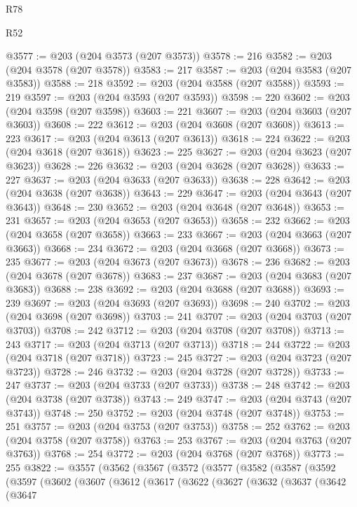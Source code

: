 \begin{lexlean}{R78}
\begin{lexlean}{R52}
\begin{coremodule}
{{{{{{{{{{{{{{{{{{{{{{{{{{{{{{{{{{{{{{{{{{{{{{{{{{{{{{{{{{{{{{{{{{{{{{{{{{{{{{{{{{{{{{{{{{{{{{{{{{{{{{{{{{{{{{{{{{{{{{{{{{{{{{{{{{{{{{{{{{{{{{{{{{{{{{{{{{{{{{{{{{{{{{{{{{{{{{{{{{{{{{{{{{{{{{{{{{{{{{@3577 := @203 (@204 @3573 (@207 @3573))
@3578 := 216
@3582 := @203 (@204 @3578 (@207 @3578))
@3583 := 217
@3587 := @203 (@204 @3583 (@207 @3583))
@3588 := 218
@3592 := @203 (@204 @3588 (@207 @3588))
@3593 := 219
@3597 := @203 (@204 @3593 (@207 @3593))
@3598 := 220
@3602 := @203 (@204 @3598 (@207 @3598))
@3603 := 221
@3607 := @203 (@204 @3603 (@207 @3603))
@3608 := 222
@3612 := @203 (@204 @3608 (@207 @3608))
@3613 := 223
@3617 := @203 (@204 @3613 (@207 @3613))
@3618 := 224
@3622 := @203 (@204 @3618 (@207 @3618))
@3623 := 225
@3627 := @203 (@204 @3623 (@207 @3623))
@3628 := 226
@3632 := @203 (@204 @3628 (@207 @3628))
@3633 := 227
@3637 := @203 (@204 @3633 (@207 @3633))
@3638 := 228
@3642 := @203 (@204 @3638 (@207 @3638))
@3643 := 229
@3647 := @203 (@204 @3643 (@207 @3643))
@3648 := 230
@3652 := @203 (@204 @3648 (@207 @3648))
@3653 := 231
@3657 := @203 (@204 @3653 (@207 @3653))
@3658 := 232
@3662 := @203 (@204 @3658 (@207 @3658))
@3663 := 233
@3667 := @203 (@204 @3663 (@207 @3663))
@3668 := 234
@3672 := @203 (@204 @3668 (@207 @3668))
@3673 := 235
@3677 := @203 (@204 @3673 (@207 @3673))
@3678 := 236
@3682 := @203 (@204 @3678 (@207 @3678))
@3683 := 237
@3687 := @203 (@204 @3683 (@207 @3683))
@3688 := 238
@3692 := @203 (@204 @3688 (@207 @3688))
@3693 := 239
@3697 := @203 (@204 @3693 (@207 @3693))
@3698 := 240
@3702 := @203 (@204 @3698 (@207 @3698))
@3703 := 241
@3707 := @203 (@204 @3703 (@207 @3703))
@3708 := 242
@3712 := @203 (@204 @3708 (@207 @3708))
@3713 := 243
@3717 := @203 (@204 @3713 (@207 @3713))
@3718 := 244
@3722 := @203 (@204 @3718 (@207 @3718))
@3723 := 245
@3727 := @203 (@204 @3723 (@207 @3723))
@3728 := 246
@3732 := @203 (@204 @3728 (@207 @3728))
@3733 := 247
@3737 := @203 (@204 @3733 (@207 @3733))
@3738 := 248
@3742 := @203 (@204 @3738 (@207 @3738))
@3743 := 249
@3747 := @203 (@204 @3743 (@207 @3743))
@3748 := 250
@3752 := @203 (@204 @3748 (@207 @3748))
@3753 := 251
@3757 := @203 (@204 @3753 (@207 @3753))
@3758 := 252
@3762 := @203 (@204 @3758 (@207 @3758))
@3763 := 253
@3767 := @203 (@204 @3763 (@207 @3763))
@3768 := 254
@3772 := @203 (@204 @3768 (@207 @3768))
@3773 := 255
@3822 := @3557
    (@3562
      (@3567
        (@3572
          (@3577
            (@3582
              (@3587
                (@3592
                  (@3597
                    (@3602
                      (@3607
                        (@3612
                          (@3617
                            (@3622
                              (@3627
                                (@3632
                                  (@3637
                                    (@3642
                                      (@3647
}}}}}}}}}}}}}}}}}}}}}}}}}}}}}}}}}}}}}}}}}}}}}}}}}}}}}}}}}}}}}}}}}}}}}}}}}}}}}}}}}}}}}}}}}}}}}}}}}}}}}}}}}}}}}}}}}}}}}}}}}}}}}}}}}}}}}}}}}}}}}}}}}}}}}}}}}}}}}}}}}}}}}}}}}}}}}}}}}}}}}}}}}}}}}}}}}}}}}}
\end{coremodule}
\end{lexlean}
\end{lexlean}
